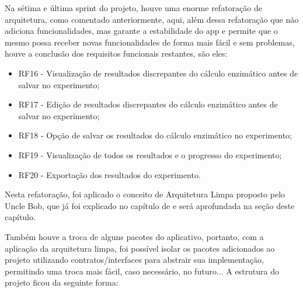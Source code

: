 Na sétima e última sprint do projeto, houve uma enorme refatoração de arquitetura, como comentado anteriormente, aqui, além dessa refatoração que não adiciona funcionalidades, mas garante a estabilidade do \ac{app} e permite que o mesmo possa receber novas funcionalidades de forma mais fácil e sem problemas, houve a conclusão dos requisitos funcionais restantes, são eles:
\begin{itemize}
   \item RF16 - Visualização de resultados discrepantes do cálculo enzimático antes de salvar no experimento;
   \item RF17 - Edição de resultados discrepantes do cálculo enzimático antes de salvar no experimento;
   \item RF18 - Opção de salvar os resultados do cálculo enzimático no experimento;
   \item RF19 - Visualização de todos os resultados e o progresso do experimento;
   \item RF20 - Exportação dos resultados do experimento.
 \end{itemize}

 Nesta refatoração, foi aplicado o conceito de Arquitetura Limpa proposto pelo Uncle Bob, que já foi explicado no capítulo de  e será aprofundada na seção  deste capítulo.
 
 Também houve a troca de alguns pacotes do aplicativo, portanto, com a aplicação da arquitetura limpa, foi possível isolar os pacotes adicionados ao projeto utilizando contratos/interfaces para abstrair sua implementação, permitindo uma troca mais fácil, caso necessário, no futuro... A estrutura do projeto ficou da seguinte forma:

